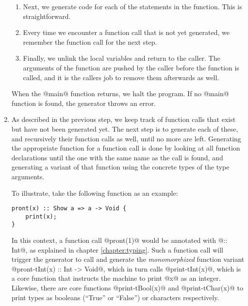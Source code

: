 \begin{enumerate}
\begin{enumerate}
        \item Next, we generate code for each of the statements in the function. This is straightforward.
        \item Every time we encounter a function call that is not yet generated, we remember the function call for the next step.
        \item Finally, we unlink the local variables and return to the caller. The arguments of the function are pushed by the caller before the function is called, and it is the callers job to remove them afterwards as well.
    \end{enumerate}
    When the @main@ function returns, we halt the program. If no @main@ function is found, the generator throws an error.
    \item As described in the previous step, we keep track of function calls that exist but have not been generated yet. The next step is to generate each of these, and recursively their function calls as well, until no more are left. Generating the appropriate function for a function call is done by looking at all function declarations until the one with the same name as the call is found, and generating a variant of that function using the concrete types of the type arguments.
    
    To illustrate, take the following function as an example:
\begin{lstlisting}
pront(x) :: Show a => a -> Void {
    print(x);
}
\end{lstlisting}
    In this context, a function call @pront(1)@ would be annotated with @:: Int@, as explained in chapter \ref{chapter:typing}. Such a function call will trigger the generator to call and generate the \textit{monomorphized} function variant @pront-tInt(x) :: Int -> Void@, which in turn calls @print-tInt(x)@, which is a core function that instructs the machine to print @x@ as an integer. Likewise, there are core functions @print-tBool(x)@ and @print-tChar(x)@ to print types as booleans (``True'' or ``False'') or characters respectively.
    

\end{enumerate}
